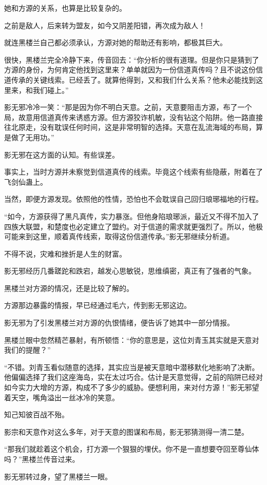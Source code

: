 \begin{this_body}
她和方源的关系，也算是比较复杂的。

之前是敌人，后来转为盟友，如今又阴差阳错，再次成为敌人！

就连黑楼兰自己都必须承认，方源对她的帮助还有影响，都极其巨大。

很快，黑楼兰完全冷静下来，传音回去：“你分析的很有道理。但是你只是猜到了方源的身份，为何肯定他找到这里来？单单就因为一份信道真传吗？且不说这份信道传承的关键线索。已经丢了。就算他得到，又和我们什么关系？他未必能找到这里来，和我们碰上。”

影无邪冷冷一笑：“那是因为你不明白天意。之前，天意要阻击方源，布了一个局，故意用信道真传来诱惑方源。但方源狡诈机敏，没有钻这个陷阱。他一路直接往北原走，没有耽误任何时间，这是非常明智的选择。天意在乱流海域的布局，算是做了无用功。”

影无邪在这方面的认知。有些误差。

事实上，当时方源并未察觉到信道真传的线索。毕竟这个线索有些隐蔽，附着在了飞剑仙蛊上。

当然，即便方源发现。依照他的性情，恐怕也不会耽误自己回归琅琊福地的行程。

“如今，方源获得了黑凡真传，实力暴涨。但他身陷琅琊派，最近又不得不加入了四族大联盟，和楚度也必定建立了盟约。对于信道的需求就更强烈了。所以，他极可能来到这里，顺着真传线索，取得这份信道传承。”影无邪继续分析道。

不得不说，灾难和挫折是人生的财富。

影无邪经历几番蹉跎和跌宕，越发心思敏锐，思维缜密，真正有了强者的气象。

黑楼兰对方源的情况，还是比较了解的。

方源那边暴露的情报，早已经通过毛六，传到影无邪这边。

影无邪为了引发黑楼兰对方源的仇恨情绪，便告诉了她其中一部分情报。

黑楼兰眼中忽然精芒暴射，有所顿悟：“你的意思是，这位刘青玉其实就是天意对我们的提醒？”

“不错。刘青玉看似随意的选择，其实应当是被天意暗中潜移默化地影响了决断。他偏偏选择了我们这座海岛，实在太过巧合。估计是天意觉得，之前的陷阱已经对如今实力大增的方源，构成不了多少的威胁。便想利用，来对付方源！”影无邪望着天空，嘴角溢出一丝冰冷的笑意。

知己知彼百战不殆。

影宗和天意作对这么多年，对于天意的图谋和布局，影无邪猜测得一清二楚。

“那我们就趁着这个机会，打方源一个狠狠的埋伏。你不是一直想要夺回至尊仙体吗？”黑楼兰传音过来。

影无邪转过身，望了黑楼兰一眼。


\end{this_body}
